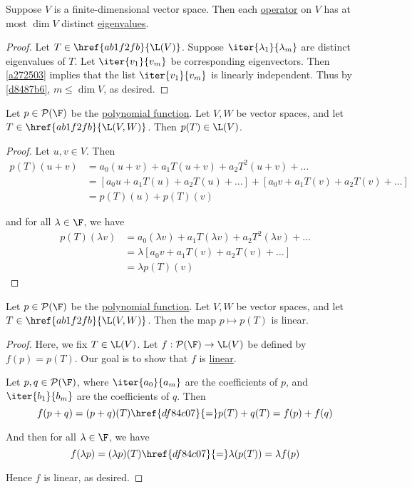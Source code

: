 \label{a36bdd2}

Suppose $V$ is a finite-dimensional vector space. Then each
\href{bd31d9c}{operator} on $V$ has at most $\dim V$ distinct
\href{e174ec3}{eigenvalues}.

\begin{proof}
  Let $T\in\href{ab1f2fb}{\L(V)}$. Suppose $\iter{\lambda_1}{\lambda_m}$ are
  distinct eigenvalues of $T$. Let $\iter{v_1}{v_m}$ be corresponding
  eigenvectors. Then \autoref{a272503} implies that the list $\iter{v_1}{v_m}$
  is linearly independent. Thus by \autoref{d8487b6}, $m\leq\dim V$, as desired.
\end{proof}

\label{a3468aa}

Let $p\in\mathcal P(\F)$ be the \href{df84c07}{polynomial function}. Let $V,W$
be vector spaces, and let $T\in\href{ab1f2fb}{\L(V,W)}$. Then $p(T)\in\L(V)$.

\begin{proof}
  Let $u,v\in V$. Then
  \begin{align*}
    p(T)(u+v) &=a_0(u+v)+a_1T(u+v)+a_2T^2(u+v)+\ldots                       \\
              &=[a_0u+a_1T(u)+a_2T(u)+\ldots]+[a_0v+a_1T(v)+a_2T(v)+\ldots] \\
              &=p(T)(u)+p(T)(v)
  \end{align*}

  and for all $\lambda\in\F$, we have
  \begin{align*}
    p(T)(\lambda v) &=a_0(\lambda v)+a_1T(\lambda v)+a_2T^2(\lambda v)+\ldots \\
                    &=\lambda[a_0v+a_1T(v)+a_2T(v)+\ldots]                    \\
                    &=\lambda p(T)(v)
  \end{align*}
\end{proof}

\label{e660331}

Let $p\in\mathcal P(\F)$ be the \href{df84c07}{polynomial function}. Let $V,W$
be vector spaces, and let $T\in\href{ab1f2fb}{\L(V,W)}$. Then the map $p\mapsto
p(T)$ is linear.

\begin{proof}
  Here, we fix $T\in\L(V)$. Let $f:\mathcal P(\F)\to\L(V)$ be defined by
  $f(p)=p(T)$. Our goal is to show that $f$ is \href{d7d1925}{linear}.

  Let $p,q\in\mathcal P(\F)$, where $\iter{a_0}{a_m}$ are the coefficients of
  $p$, and $\iter{b_1}{b_m}$ are the coefficients of $q$. Then
  $$
    f(p+q)=(p+q)(T)\href{df84c07}{=}p(T)+q(T)=f(p)+f(q)
  $$

  And then for all $\lambda\in\F$, we have
  $$
    f(\lambda p)=(\lambda p)(T)\href{df84c07}{=}\lambda(p(T))=\lambda f(p)
  $$

  Hence $f$ is linear, as desired.
\end{proof}

